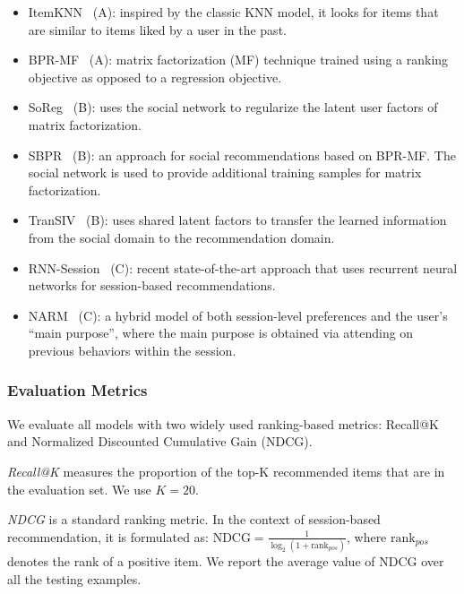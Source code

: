 \documentclass[sigconf]{acmart}
\begin{document}
\begin{itemize}[leftmargin=0.2in]
\item ItemKNN~\cite{linden2003amazon} (A): inspired by the classic KNN model, it looks for items that are similar to items liked by a user in the past.
\item BPR-MF~\cite{rendle2009bpr} (A): matrix factorization (MF) technique trained using a ranking objective as opposed to a regression objective.
\item SoReg~\cite{ma2011recommender} (B): uses the social network to regularize the latent user factors of matrix factorization.
\item SBPR~\cite{zhao2014leveraging} (B): an approach for social recommendations based on BPR-MF. The social network is used to provide additional training samples for matrix factorization.
\item TranSIV~\cite{xiao2017learning} (B): uses shared latent factors to transfer the learned information from the social domain to the recommendation domain.
\item RNN-Session~\cite{hidasi2016session} (C): recent state-of-the-art approach that uses recurrent neural networks for session-based recommendations.
\item NARM~\cite{li2017neural} (C): a hybrid model of both session-level preferences and the user's ``main purpose'', where the main purpose is obtained via attending on previous behaviors within the session.
\end{itemize}


\subsubsection{Evaluation Metrics}
We evaluate all models with two widely used ranking-based metrics: Recall@K and Normalized Discounted Cumulative Gain (NDCG).

\textit{Recall@K} measures the proportion of the top-K recommended items that are in the evaluation set. We use $K=20$.





\textit{NDCG} is a standard ranking metric. In the context of session-based recommendation, it is formulated as: $\text{NDCG}=\frac{1}{\log_{2}(1+\text{rank}_{pos})}$, where $\text{rank}_{pos}$ denotes the rank of a positive item. We report the average value of NDCG over all the testing examples.
\end{document}
